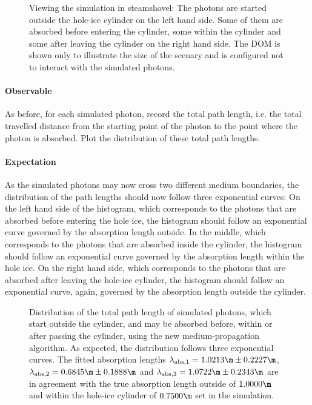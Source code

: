 \begin{figure}
  \caption{Viewing the simulation in steamshovel: The photons are started outside the hole-ice cylinder on the left hand side. Some of them are absorbed before entering the cylinder, some within the cylinder and some after leaving the cylinder on the right hand side. The DOM is shown only to illustrate the size of the scenary and is configured not to interact with the simulated photons.}
\end{figure}

\paragraph{Observable} As before, for each simulated photon, record the total path length, i.e. the total travelled distance from the starting point of the photon to the point where the photon is absorbed. Plot the distribution of these total path lengths.

\paragraph{Expectation} As the simulated photons may now cross two different medium boundaries, the distribution of the path lengths should now follow three exponential curves: On the left hand side of the histogram, which corresponds to the photons that are absorbed before entering the hole ice, the histogram should follow an exponential curve governed by the absorption length outside. In the middle, which corresponds to the photons that are absorbed inside the cylinder, the histogram should follow an exponential curve governed by the absorption length within the hole ice. On the right hand side, which corresponds to the photons that are absorbed after leaving the hole-ice cylinder, the histogram should follow an exponential curve, again, governed by the absorption length outside the cylinder.

\begin{figure}
  \caption{Distribution of the total path length of simulated photons, which start outside the cylinder, and may be absorbed before, within or after passing the cylinder, using the new medium-propagation algorithm. As expected, the distribution follows three exponential curves. The fitted absorption lengths $\lambda_\text{abs,1} = 1.0213\m \pm 0.2227\m$, $\lambda_\text{abs,2} = 0.6845\m \pm 0.1888\m$ and $\lambda_\text{abs,3} = 1.0722\m \pm 0.2343\m$ are in agreement with the true absorption length outside of $1.0000\m$ and within the hole-ice cylinder of $0.7500\m$ set in the simulation.}
\end{figure}


